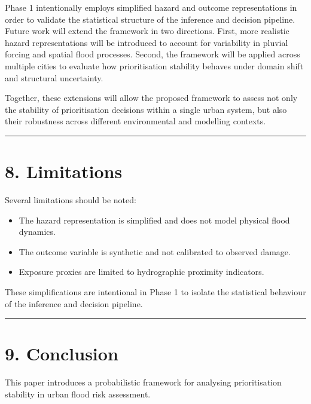 \documentclass[
]{article}
\providecommand{\tightlist}{%
  \setlength{\itemsep}{0pt}\setlength{\parskip}{0pt}}
\begin{document}
Phase 1 intentionally employs simplified hazard and outcome
representations in order to validate the statistical structure of the
inference and decision pipeline. Future work will extend the framework
in two directions. First, more realistic hazard representations will be
introduced to account for variability in pluvial forcing and spatial
flood processes. Second, the framework will be applied across multiple
cities to evaluate how prioritisation stability behaves under domain
shift and structural uncertainty.

Together, these extensions will allow the proposed framework to assess
not only the stability of prioritisation decisions within a single urban
system, but also their robustness across different environmental and
modelling contexts.

\begin{center}\rule{0.5\linewidth}{0.5pt}\end{center}

\section{8. Limitations}\label{limitations}

Several limitations should be noted:

\begin{itemize}
\tightlist
\item
  The hazard representation is simplified and does not model physical
  flood dynamics.
\item
  The outcome variable is synthetic and not calibrated to observed
  damage.
\item
  Exposure proxies are limited to hydrographic proximity indicators.
\end{itemize}

These simplifications are intentional in Phase 1 to isolate the
statistical behaviour of the inference and decision pipeline.

\begin{center}\rule{0.5\linewidth}{0.5pt}\end{center}

\section{9. Conclusion}\label{conclusion}

This paper introduces a probabilistic framework for analysing
prioritisation stability in urban flood risk assessment.
\end{document}
